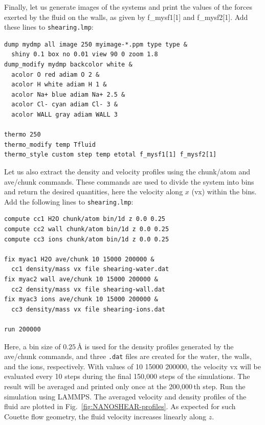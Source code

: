 \documentclass[9pt,tutorial]{livecoms}
\newcommand{\lmpcmd}[1]{\hspace{0pt}\colorbox{listing}{\textcolor{command}{\small{#1}}}\hspace{0pt}} %
\newcommand{\flecmd}[1]{\textcolor{command}{\texttt{#1}}} %
\begin{document}
Finally, let us generate images of the systems and print the values of the
forces exerted by the fluid on the walls, as given by \lmpcmd{f\_mysf1[1]}
and \lmpcmd{f\_mysf2[1]}.  Add these lines to \flecmd{shearing.lmp}:
\begin{lstlisting}
dump mydmp all image 250 myimage-*.ppm type type &
  shiny 0.1 box no 0.01 view 90 0 zoom 1.8
dump_modify mydmp backcolor white &
  acolor O red adiam O 2 &
  acolor H white adiam H 1 &
  acolor Na+ blue adiam Na+ 2.5 &
  acolor Cl- cyan adiam Cl- 3 &
  acolor WALL gray adiam WALL 3

thermo 250
thermo_modify temp Tfluid
thermo_style custom step temp etotal f_mysf1[1] f_mysf2[1]
\end{lstlisting}
Let us also extract the density and velocity profiles using
the \lmpcmd{chunk/atom} and \lmpcmd{ave/chunk} commands.  These commands are
used to divide the system into bins and return the desired quantities, here the velocity
along $x$ (\lmpcmd{vx}) within the bins.  Add the following lines to \flecmd{shearing.lmp}:
\begin{lstlisting}
compute cc1 H2O chunk/atom bin/1d z 0.0 0.25
compute cc2 wall chunk/atom bin/1d z 0.0 0.25
compute cc3 ions chunk/atom bin/1d z 0.0 0.25

fix myac1 H2O ave/chunk 10 15000 200000 &
  cc1 density/mass vx file shearing-water.dat
fix myac2 wall ave/chunk 10 15000 200000 &
  cc2 density/mass vx file shearing-wall.dat
fix myac3 ions ave/chunk 10 15000 200000 &
  cc3 density/mass vx file shearing-ions.dat

run 200000
\end{lstlisting}
Here, a bin size of $0.25\,\text{\AA{}}$ is used for the density profiles generated
by the \lmpcmd{ave/chunk} commands, and three \flecmd{.dat} files are created for
the water, the walls, and the ions, respectively.  With values of \lmpcmd{10 15000 200000},
the velocity \lmpcmd{vx} will be evaluated every 10 steps during the final 150,000
steps of the simulations.  The result will be averaged and printed only once at the 200,000\,th step.
Run the simulation using LAMMPS.  The averaged velocity and density
profiles of the fluid are plotted in Fig.~\ref{fig:NANOSHEAR-profiles}.
As expected for such Couette flow geometry, the fluid velocity increases linearly along $z$.
\end{document}
